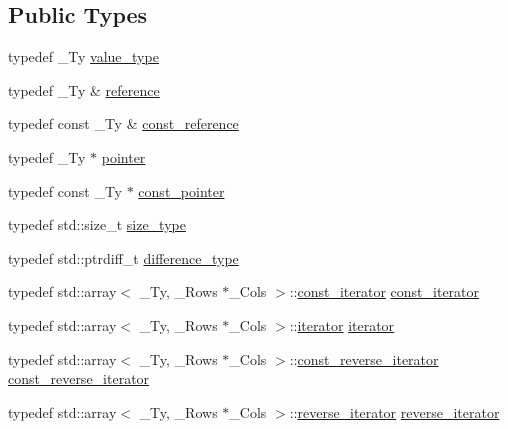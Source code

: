 \subsection*{Public Types}
\begin{DoxyCompactItemize}
\item 
typedef \+\_\+\+Ty \hyperlink{classcrsc_1_1fixed__matrix_a1d0717197dc43f3752d508763a8b5a9e}{value\+\_\+type}
\item 
typedef \+\_\+\+Ty \& \hyperlink{classcrsc_1_1fixed__matrix_aee0de54210ab3caf2245732d9f79d508}{reference}
\item 
typedef const \+\_\+\+Ty \& \hyperlink{classcrsc_1_1fixed__matrix_ac96e937b9ecde6b2700b0865218276c4}{const\+\_\+reference}
\item 
typedef \+\_\+\+Ty $\ast$ \hyperlink{classcrsc_1_1fixed__matrix_af3fa7b73e09308460e22826c2eae30d3}{pointer}
\item 
typedef const \+\_\+\+Ty $\ast$ \hyperlink{classcrsc_1_1fixed__matrix_a34598e630abde53cf355ea9aba5f1930}{const\+\_\+pointer}
\item 
typedef std\+::size\+\_\+t \hyperlink{classcrsc_1_1fixed__matrix_a4f4ba9cbd0e0723193df4c8281ddd99b}{size\+\_\+type}
\item 
typedef std\+::ptrdiff\+\_\+t \hyperlink{classcrsc_1_1fixed__matrix_aee3bdb836ff42652fa97227901681dcc}{difference\+\_\+type}
\item 
typedef std\+::array$<$ \+\_\+\+Ty, \+\_\+\+Rows $\ast$\+\_\+\+Cols $>$\+::\hyperlink{classcrsc_1_1fixed__matrix_a72bc60fb8dc523b5608a9413b8cbad11}{const\+\_\+iterator} \hyperlink{classcrsc_1_1fixed__matrix_a72bc60fb8dc523b5608a9413b8cbad11}{const\+\_\+iterator}
\item 
typedef std\+::array$<$ \+\_\+\+Ty, \+\_\+\+Rows $\ast$\+\_\+\+Cols $>$\+::\hyperlink{classcrsc_1_1fixed__matrix_a8cbb0e4470c83713e2b1dc8e6ae956bc}{iterator} \hyperlink{classcrsc_1_1fixed__matrix_a8cbb0e4470c83713e2b1dc8e6ae956bc}{iterator}
\item 
typedef std\+::array$<$ \+\_\+\+Ty, \+\_\+\+Rows $\ast$\+\_\+\+Cols $>$\+::\hyperlink{classcrsc_1_1fixed__matrix_a8af1c1c37f8a05a1ac04d4e8ec57a494}{const\+\_\+reverse\+\_\+iterator} \hyperlink{classcrsc_1_1fixed__matrix_a8af1c1c37f8a05a1ac04d4e8ec57a494}{const\+\_\+reverse\+\_\+iterator}
\item 
typedef std\+::array$<$ \+\_\+\+Ty, \+\_\+\+Rows $\ast$\+\_\+\+Cols $>$\+::\hyperlink{classcrsc_1_1fixed__matrix_ae5db33c8d1ed0872563bfb00c602b33f}{reverse\+\_\+iterator} \hyperlink{classcrsc_1_1fixed__matrix_ae5db33c8d1ed0872563bfb00c602b33f}{reverse\+\_\+iterator}
\end{DoxyCompactItemize}
